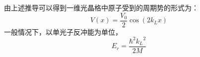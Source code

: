 \documentclass{article}
\begin{document}
	


	\clearpage
	由上述推导可以得到一维光晶格中原子受到的周期势的形式为：
	\begin{equation}
		V(x) = \frac{V_0}{2} \cos(2k_Lx)
	\end{equation}
	一般情况下，以单光子反冲能为单位，
	\begin{equation}
		E_r = \frac{\hbar^2 {k_L}^2}{2M}
	\end{equation}
\end{document}

